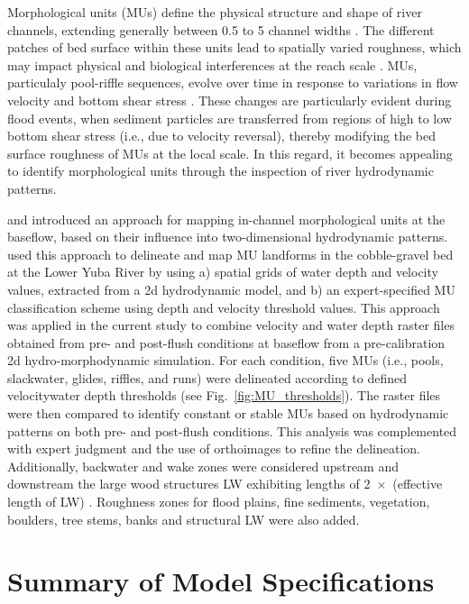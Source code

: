 Morphological units (MUs) define the physical structure and shape of river channels, extending generally between 0.5 to 5 channel widths \cite{woodworth2022are}. The different patches of bed surface within these units lead to spatially varied roughness, which may impact physical and biological interferences at the reach scale \cite{buffington1999effects,dietrich2005sediment}. MUs, particulaly pool-riffle sequences, evolve over time in response to variations in flow velocity and bottom shear stress \cite{salmela2020morphological, pasternack2017flooddriven,cao2003flow}. These changes are particularly evident during flood events, when sediment particles are transferred from regions of high to low bottom shear stress (i.e., due to velocity reversal), thereby modifying the bed surface roughness of MUs at the local scale. In this regard, it becomes appealing to identify morphological units through the inspection of river hydrodynamic patterns. 

\cite{wyrick2012landforms} and \cite{wyrick2014revealing} introduced an approach for mapping in-channel morphological units at the baseflow, based on their influence into two-dimensional hydrodynamic patterns. \cite{wyrick2014geospatial} used this approach to delineate and map MU landforms in the cobble-gravel bed at the Lower Yuba River by using a) spatial grids of water depth and velocity values, extracted from a 2d hydrodynamic model, and b) an expert-specified MU classification scheme using depth and velocity threshold values. This approach was applied in the current study to combine velocity and water depth raster files obtained from pre- and post-flush conditions at baseflow from a pre-calibration 2d hydro-morphodynamic simulation. For each condition, five MUs (i.e., pools, slackwater, glides, riffles, and runs) were delineated according to defined velocity\textendash water depth thresholds (see Fig.~\ref{fig:MU_thresholds}). The raster files were then compared to identify constant or stable MUs based on hydrodynamic patterns on both pre- and post-flush conditions. This analysis was complemented with expert judgment and the use of orthoimages to refine the delineation. Additionally, backwater and wake  zones were considered upstream and downstream the large wood structures LW exhibiting lengths of 2~$\times$~(effective length of LW) \cite{scolari2025hydromorphodynamic}. Roughness zones for flood plains, fine sediments, vegetation, boulders, tree stems, banks and structural LW were also added.    

\section{Summary of Model Specifications}

